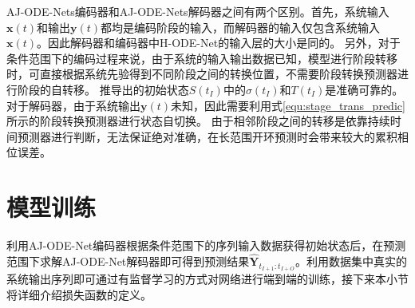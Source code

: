 

AJ-ODE-Nets编码器和AJ-ODE-Nets解码器之间有两个区别。首先，系统输入$\boldsymbol x(t)$和输出$\boldsymbol y(t)$都均是编码阶段的输入，而解码器的输入仅包含系统输入$\boldsymbol x(t)$。因此解码器和编码器中H-ODE-Net的输入层的大小是同的。
另外，对于条件范围下的编码过程来说，由于系统的输入输出数据已知，模型进行阶段转移时，可直接根据系统先验得到不同阶段之间的转换位置，不需要阶段转换预测器进行阶段的自转移。
推导出的初始状态$S(t_I)$中的$\sigma(t_I)$和$T(t_I)$是准确可靠的。
对于解码器，由于系统输出$\boldsymbol y(t)$未知，因此需要利用式\ref{equ:stage_trans_predic}所示的阶段转换预测器进行状态自切换。
由于相邻阶段之间的转移是依靠持续时间预测器进行判断，无法保证绝对准确，在长范围开环预测时会带来较大的累积相位误差。
\section{模型训练}
\label{sec:4_loss_function}
利用AJ-ODE-Net编码器根据条件范围下的序列输入数据获得初始状态后，在预测范围下求解AJ-ODE-Net解码器即可得到预测结果$\hat{\boldsymbol{Y}}_{t_{I+1}: t_{I+O}}$。利用数据集中真实的系统输出序列即可通过有监督学习的方式对网络进行端到端的训练，接下来本小节将详细介绍损失函数的定义。

